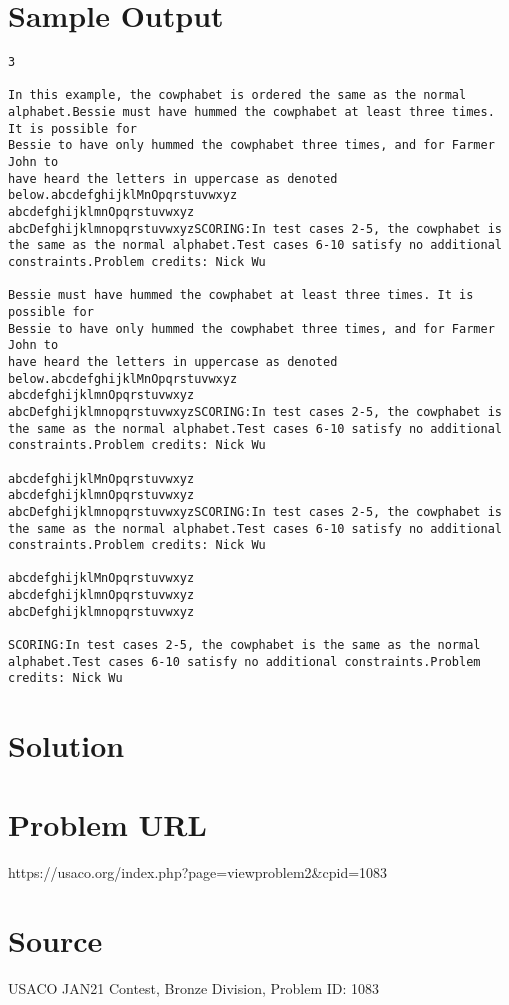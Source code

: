 \documentclass[12pt]{article}
\begin{document}
\section*{Sample Output}
\begin{verbatim}
3

In this example, the cowphabet is ordered the same as the normal alphabet.Bessie must have hummed the cowphabet at least three times. It is possible for
Bessie to have only hummed the cowphabet three times, and for Farmer John to
have heard the letters in uppercase as denoted below.abcdefghijklMnOpqrstuvwxyz
abcdefghijklmnOpqrstuvwxyz
abcDefghijklmnopqrstuvwxyzSCORING:In test cases 2-5, the cowphabet is the same as the normal alphabet.Test cases 6-10 satisfy no additional constraints.Problem credits: Nick Wu

Bessie must have hummed the cowphabet at least three times. It is possible for
Bessie to have only hummed the cowphabet three times, and for Farmer John to
have heard the letters in uppercase as denoted below.abcdefghijklMnOpqrstuvwxyz
abcdefghijklmnOpqrstuvwxyz
abcDefghijklmnopqrstuvwxyzSCORING:In test cases 2-5, the cowphabet is the same as the normal alphabet.Test cases 6-10 satisfy no additional constraints.Problem credits: Nick Wu

abcdefghijklMnOpqrstuvwxyz
abcdefghijklmnOpqrstuvwxyz
abcDefghijklmnopqrstuvwxyzSCORING:In test cases 2-5, the cowphabet is the same as the normal alphabet.Test cases 6-10 satisfy no additional constraints.Problem credits: Nick Wu

abcdefghijklMnOpqrstuvwxyz
abcdefghijklmnOpqrstuvwxyz
abcDefghijklmnopqrstuvwxyz

SCORING:In test cases 2-5, the cowphabet is the same as the normal alphabet.Test cases 6-10 satisfy no additional constraints.Problem credits: Nick Wu
\end{verbatim}

\section*{Solution}


\section*{Problem URL}
https://usaco.org/index.php?page=viewproblem2&cpid=1083

\section*{Source}
USACO JAN21 Contest, Bronze Division, Problem ID: 1083
\end{document}
